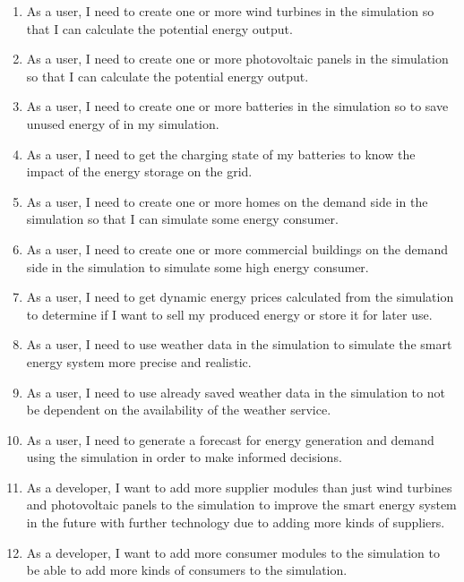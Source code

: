 \begin{enumerate}
\item As a user, I need to create one or more wind turbines in the simulation so that I can calculate the potential energy output.

\item As a user, I need to create one or more photovoltaic panels in the simulation so that I can calculate the potential energy output.

\item As a user, I need to create one or more batteries in the simulation so to save unused energy of in my simulation.

\item As a user, I need to get the charging state of my batteries to know the impact of the energy storage on the grid.

\item As a user, I need to create one or more homes on the demand side in the simulation so that I can simulate some energy consumer.

\item As a user, I need to create one or more commercial buildings on the demand side in the simulation to simulate some high energy consumer.

\item As a user, I need to get dynamic energy prices calculated from the simulation to determine if I want to sell my produced energy or store it for later use.

\item As a user, I need to use weather data in the simulation to simulate the smart energy system more precise and realistic.

\item As a user, I need to use already saved weather data in the simulation to not be dependent on the availability of the weather service.

\item As a user, I need to generate a forecast for energy generation and demand using the simulation in order to make informed decisions.

\item As a developer, I want to add more supplier modules than just wind turbines and photovoltaic panels to the simulation to improve the smart energy system in the future with further technology due to adding more kinds of suppliers. 

\item As a developer, I want to add more consumer modules to the simulation to be able to add more kinds of consumers to the simulation. 


\end{enumerate}
